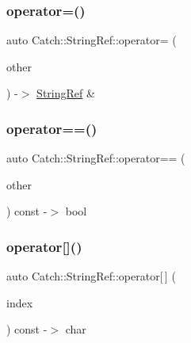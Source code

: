 \mbox{\label{classCatch_1_1StringRef_a6b68f1c6f37f56cee150a1b76f71926b}} 
\subsubsection{\texorpdfstring{operator=()}{operator=()}}
{\footnotesize\ttfamily auto Catch\+::\+String\+Ref\+::operator= (\begin{DoxyParamCaption}\item[{\mbox{\hyperlink{classCatch_1_1StringRef}{String\+Ref}}}]{other }\end{DoxyParamCaption}) -\/$>$  \mbox{\hyperlink{classCatch_1_1StringRef}{String\+Ref}} \&\hspace{0.3cm}{\ttfamily [noexcept]}}

\mbox{\label{classCatch_1_1StringRef_aabb30149ab961187e4b3ff3394bf6e73}} 
\subsubsection{\texorpdfstring{operator==()}{operator==()}}
{\footnotesize\ttfamily auto Catch\+::\+String\+Ref\+::operator== (\begin{DoxyParamCaption}\item[{\mbox{\hyperlink{classCatch_1_1StringRef}{String\+Ref}} const \&}]{other }\end{DoxyParamCaption}) const -\/$>$  bool\hspace{0.3cm}{\ttfamily [noexcept]}}

\mbox{\label{classCatch_1_1StringRef_a4ba2e01eec1f0f56c257d213c796ab3b}} 
\subsubsection{\texorpdfstring{operator[]()}{operator[]()}}
{\footnotesize\ttfamily auto Catch\+::\+String\+Ref\+::operator\mbox{[}$\,$\mbox{]} (\begin{DoxyParamCaption}\item[{size\+\_\+type}]{index }\end{DoxyParamCaption}) const -\/$>$  char\hspace{0.3cm}{\ttfamily [noexcept]}}


